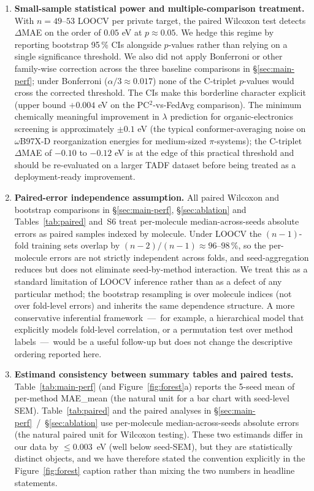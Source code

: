 \documentclass[11pt,a4paper]{article}
\begin{document}
\begin{enumerate}
  \item \textbf{Small-sample statistical power and multiple-comparison treatment.} With $n = 49$--$53$ LOOCV per private target, the paired Wilcoxon test detects $\Delta$MAE on the order of $0.05$ eV at $p \approx 0.05$. We hedge this regime by reporting bootstrap 95\,\% CIs alongside $p$-values rather than relying on a single significance threshold. We also did not apply Bonferroni or other family-wise correction across the three baseline comparisons in \S\ref{sec:main-perf}; under Bonferroni ($\alpha/3 \approx 0.017$) none of the C-triplet $p$-values would cross the corrected threshold. The CIs make this borderline character explicit (upper bound $+0.004$ eV on the PC$^2$-vs-FedAvg comparison). The minimum chemically meaningful improvement in $\lambda$ prediction for organic-electronics screening is approximately $\pm 0.1$ eV (the typical conformer-averaging noise on $\omega$B97X-D reorganization energies for medium-sized $\pi$-systems); the C-triplet $\Delta$MAE of $-0.10$ to $-0.12$ eV is at the edge of this practical threshold and should be re-evaluated on a larger TADF dataset before being treated as a deployment-ready improvement.

  \item \textbf{Paired-error independence assumption.} All paired Wilcoxon and bootstrap comparisons in \S\ref{sec:main-perf}, \S\ref{sec:ablation} and Tables~\ref{tab:paired} and~S6 treat per-molecule median-across-seeds absolute errors as paired samples indexed by molecule. Under LOOCV the $(n-1)$-fold training sets overlap by $(n-2)/(n-1) \approx 96$--$98$\,\%, so the per-molecule errors are not strictly independent across folds, and seed-aggregation reduces but does not eliminate seed-by-method interaction. We treat this as a standard limitation of LOOCV inference rather than as a defect of any particular method; the bootstrap resampling is over molecule indices (not over fold-level errors) and inherits the same dependence structure. A more conservative inferential framework~---~for example, a hierarchical model that explicitly models fold-level correlation, or a permutation test over method labels~---~would be a useful follow-up but does not change the descriptive ordering reported here.

  \item \textbf{Estimand consistency between summary tables and paired tests.} Table~\ref{tab:main-perf} (and Figure~\ref{fig:forest}a) reports the 5-seed mean of per-method MAE\_mean (the natural unit for a bar chart with seed-level SEM). Table~\ref{tab:paired} and the paired analyses in \S\ref{sec:main-perf}~/~\S\ref{sec:ablation} use per-molecule median-across-seeds absolute errors (the natural paired unit for Wilcoxon testing). These two estimands differ in our data by $\le 0.003$~eV (well below seed-SEM), but they are statistically distinct objects, and we have therefore stated the convention explicitly in the Figure~\ref{fig:forest} caption rather than mixing the two numbers in headline statements.


\end{enumerate}
\end{document}
